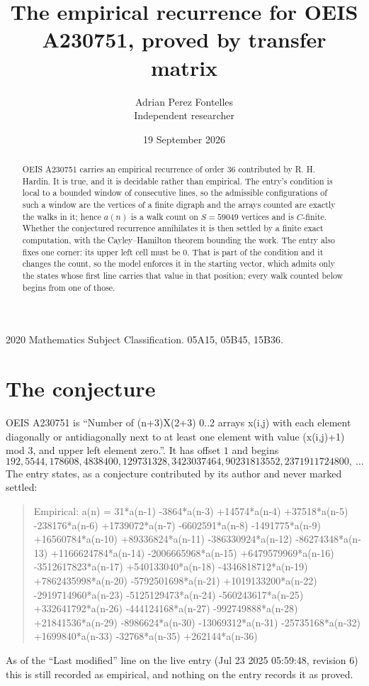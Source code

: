 \documentclass[11pt,a4paper]{article}
\title{The empirical recurrence for OEIS A230751, proved by transfer matrix}
\author{Adrian Perez Fontelles\\ \small Independent researcher}
\date{19 September 2026}
\theoremstyle{plain}
\theoremstyle{definition}
\begin{document}
\maketitle

\begin{abstract}
OEIS A230751 carries an empirical recurrence of order $36$ contributed by R. H. Hardin. It is
true, and it is decidable rather than empirical. The entry's condition is local to a bounded window of consecutive lines, so
the admissible configurations of such a window are the vertices of a finite digraph and the
arrays counted are exactly the walks in it; hence $a(n)$ is a walk count on $S=59049$ vertices
and is $C$-finite. Whether the conjectured recurrence annihilates it is then settled by a
finite exact computation, with the Cayley--Hamilton theorem bounding the work.
 The entry also fixes one corner: its upper left cell must be $0$. That is part of the condition and it changes the count, so the model enforces it in the starting vector, which admits only the states whose first line carries that value in that position; every walk counted below begins from one of those.\end{abstract}

\noindent\small 2020 Mathematics Subject Classification. 05A15, 05B45, 15B36.\normalsize

\section{The conjecture}

OEIS A230751 is ``Number of (n+3)X(2+3) 0..2 arrays x(i,j) with each element diagonally or antidiagonally next to at least one element with value (x(i,j)+1) mod 3, and upper left element zero.''. It has offset $1$ and begins
\[
192, 5544, 178608, 4838400, 129731328, 3423037464, 90231813552, 2371911724800,\ \dots
\]
The entry states, as a conjecture contributed by its author and never marked settled:
\begin{quote}\raggedright\small
Empirical: a(n) = 31*a(n-1) -3864*a(n-3) +14574*a(n-4) +37518*a(n-5) -238176*a(n-6) +1739072*a(n-7) -6602591*a(n-8) -1491775*a(n-9) +16560784*a(n-10) +89336824*a(n-11) -386330924*a(n-12) -86274348*a(n-13) +1166624784*a(n-14) -2006665968*a(n-15) +6479579969*a(n-16) -3512617823*a(n-17) +540133040*a(n-18) -4346818712*a(n-19) +7862435998*a(n-20) -5792501698*a(n-21) +1019133200*a(n-22) -2919714960*a(n-23) -5125129473*a(n-24) -560243617*a(n-25) +332641792*a(n-26) -444124168*a(n-27) -992749888*a(n-28) +21841536*a(n-29) -8986624*a(n-30) -13069312*a(n-31) -25735168*a(n-32) +1699840*a(n-33) -32768*a(n-35) +262144*a(n-36)
\end{quote}
As of the ``Last modified'' line on the live entry (Jul 23 2025 05:59:48, revision 6) this is still
recorded as empirical, and nothing on the entry records it as proved.
\end{document}
